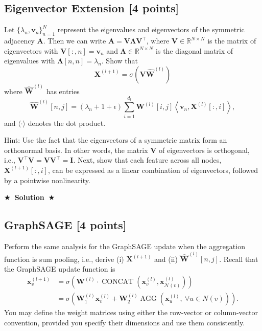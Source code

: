 \documentclass{article}
\numberwithin{figure}{section}
\newcommand{\Solution}[1]{%
    {%
        \medskip
        \color{red}
        \bf $\bigstar$~\sf\textbf{Solution}~$\bigstar$ \sf
        #1
    }
    \bigskip
}
\begin{document}
\subsection{Eigenvector Extension [4 points]}
Let $\{\lambda_n,\mathbf{v}_n\}_{n=1}^N$ represent the eigenvalues and eigenvectors of the symmetric adjacency $\textbf{A}$. Then we can write $\textbf{A}=\textbf{V}\mathbf{\Lambda} \textbf{V}^\top$, where $\textbf{V}\in\mathbb{R}^{N\times N}$ is the matrix of eigenvectors with $\textbf{V}[:,n]=\mathbf{v}_n$ and $\mathbf{\Lambda}\in\mathbb{R}^{N\times N}$ is the diagonal matrix of eigenvalues with $\mathbf{\Lambda}[n,n]=\lambda_n$. Show that
\[\textbf{X}^{(l+1)}=\sigma\left(\textbf{V}\mathbf{\hat W}^{(l)}\right)\]
where $\mathbf{\hat W}^{(l)}$ has entries
\[\mathbf{\hat W}^{(l)}[n,j]=(\lambda_n+1+\epsilon)\sum_{i=1}^{d_l}\textbf{W}^{(l)}[i,j]\left\langle\mathbf{v}_n,\textbf{X}^{(l)}[:,i]\right\rangle,\]
and $\langle\cdot\rangle$ denotes the dot product.

Hint: Use the fact that the eigenvectors of a symmetric matrix form an orthonormal basis. In other words, the matrix $\textbf{V}$ of eigenvectors is orthogonal, i.e., $\textbf{V}^\top \textbf{V}=\textbf{VV}^\top=\textbf{I}$. Next, show that each feature across all nodes, $\textbf{X}^{(l+1)}[:,i]$, can be expressed as a linear combination of eigenvectors, followed by a pointwise nonlinearity.

\Solution{}

\subsection{GraphSAGE [4 points]}
Perform the same analysis for the GraphSAGE update when the aggregation function is sum pooling, i.e., derive (i) $\textbf{X}^{(l+1)}$ and (ii) $\mathbf{\hat W}^{(l)}[n,j]$. Recall that the GraphSAGE update function is
\begin{align*}
\mathbf{x}_v^{(l+1)}&=\sigma\left(\textbf{W}^{(l)}\cdot\operatorname{CONCAT}\left(\mathbf{x}_v^{(l)},\mathbf{x}_{\mathcal{N}(v)}^{(l)}\right)\right)\\
&=\sigma\left(\textbf{W}_1^{(l)}\mathbf{x}_v^{(l)}+\textbf{W}_2^{(l)}\operatorname{AGG}\left(\mathbf{x}_u^{(l)},\ \forall u\in N(v)\right)\right).
\end{align*}
You may define the weight matrices using either the row-vector or column-vector convention, provided you specify their dimensions and use them consistently.
\end{document}
